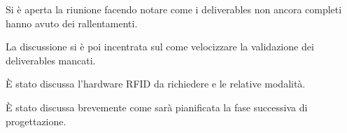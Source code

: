 Si è aperta la riunione facendo notare come i deliverables non ancora completi hanno avuto dei rallentamenti.

La discussione si è poi incentrata sul come velocizzare la validazione dei deliverables mancati.

È stato discussa l'hardware RFID da richiedere e le relative modalità.

È stato discussa brevemente come sarà pianificata la fase successiva di progettazione.

